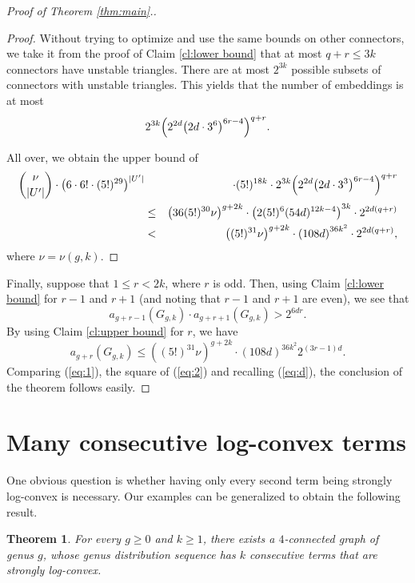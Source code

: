 \documentclass[11pt]{article}
\newtheorem{theorem}{Theorem}
\begin{document}
\begin{proof}[Proof of Theorem \ref{thm:main}.]
\begin{proof}
  Without trying to optimize and use the same bounds on other connectors, we take it from the proof of Claim \ref{cl:lower bound} that at most $q+r \le 3k$ connectors have unstable triangles. There are at most $2^{3k}$ possible subsets of connectors with unstable triangles. This yields that the number of embeddings is at most
  $$
     2^{3k}\Bigl(2^{2d} \bigl(2d\cdot 3^6\bigr)^{6r-4}\Bigr)^{q+r} .
  $$

  All over, we obtain the upper bound of
  \begin{eqnarray*}
     \binom{\nu}{|U'|} \cdot \left(6 \cdot 6! \cdot (5!)^{29}\right)^{|U'|} && \cdot (5!)^{18k} \cdot
     2^{3k} \Bigl(2^{2d} \bigl(2d\cdot 3^3\bigr)^{6r-4}\Bigl)^{q+r} \\
     &\le& \left(36 (5!)^{30} \nu\right)^{g+2k} \cdot \left( 2 (5!)^6 (54d)^{12k-4} \right)^{3k} \cdot 2^{2d(q+r)}  \\
     &<& \left((5!)^{31} \nu\right)^{g+2k} \cdot \left(108d\right)^{36k^2}
     \cdot 2^{2d(q+r)} ,
  \end{eqnarray*}
  where $\nu=\nu(g,k)$.
  \end{proof}

Finally, suppose that $1 \le r < 2k$, where $r$ is odd. Then, using Claim \ref{cl:lower bound} for $r-1$ and $r+1$ (and noting that $r-1$ and $r+1$ are even), we see that
\begin{equation}\label{eq:1}
   a_{g+r-1}(G_{g,k})\cdot a_{g+r+1}(G_{g,k}) > 2^{6dr}.
\end{equation}
By using Claim \ref{cl:upper bound} for $r$, we have
\begin{equation}\label{eq:2}
   a_{g+r}(G_{g,k}) \le \left((5!)^{31} \nu\right)^{g+2k} \cdot (108d)^{36k^2} 2^{(3r-1)d} .
\end{equation}
Comparing (\ref{eq:1}), the square of (\ref{eq:2}) and recalling (\ref{eq:d}), the conclusion of the theorem follows easily.
\end{proof}


\section{Many consecutive log-convex terms}

One obvious question is whether having only every second term being strongly log-convex is necessary. Our examples can be generalized to obtain the following result.

\begin{theorem}\label{thm:second main result}
  For every $g\ge0$ and $k\ge1$, there exists a $4$-connected graph of genus $g$, whose genus distribution sequence has $k$ consecutive terms that are strongly log-convex.
\end{theorem}
\end{document}
